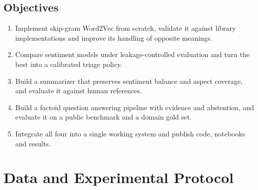 \documentclass[11pt,a4paper]{article}
\begin{document}
\subsection{Objectives}
\begin{enumerate}
\item Implement skip-gram Word2Vec from scratch, validate it against library implementations and improve its handling of opposite meanings.
\item Compare sentiment models under leakage-controlled evaluation and turn the best into a calibrated triage policy.
\item Build a summarizer that preserves sentiment balance and aspect coverage, and evaluate it against human references.
\item Build a factoid question answering pipeline with evidence and abstention, and evaluate it on a public benchmark and a domain gold set.
\item Integrate all four into a single working system and publish code, notebooks and results.
\end{enumerate}

\section{Data and Experimental Protocol}
\end{document}
